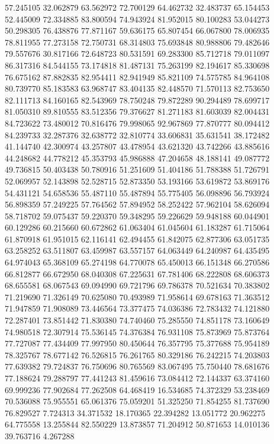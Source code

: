 57.245105
32.062879
63.562972
72.700129
64.462732
32.483737
65.154453
52.445009
72.334885
83.800594
74.943924
81.952015
80.100283
53.044273
50.298305
76.438876
77.871167
59.636175
65.807454
66.067800
78.006935
78.811955
77.273158
72.750731
68.314803
75.693848
80.988806
79.482646
79.557676
30.817166
72.648723
80.531591
69.283300
85.712718
79.011097
86.317316
84.544155
73.174818
81.487131
75.263199
82.194617
85.330698
76.675162
87.882835
82.954411
82.941949
85.821109
74.575785
84.964108
80.739770
85.183583
63.968747
83.404135
82.448570
71.570113
82.753650
82.111713
84.160165
82.543969
78.750248
79.872289
90.294489
78.699717
81.050310
89.810555
83.512356
79.376627
81.271183
81.603039
82.004431
84.723622
73.480012
70.816476
79.998065
92.967869
77.870777
80.094412
84.239733
32.287376
32.638772
32.810774
33.606831
35.631541
38.172482
41.144740
42.300974
43.257807
43.478954
43.621320
43.742266
43.885616
44.248682
44.778212
45.353793
45.986888
47.204658
48.188141
49.087772
49.736815
50.403438
50.780916
51.251609
51.404186
51.788388
51.726791
52.069957
52.143898
52.528715
52.873350
53.193166
53.619872
53.869176
54.431121
54.658536
55.487110
55.487894
55.775405
56.098896
56.793924
56.898359
57.249225
57.764562
57.894952
58.252422
57.962104
58.626094
58.718702
59.075437
59.220370
59.348295
59.226629
59.948188
60.044901
60.129286
60.215660
60.672862
61.063404
61.045604
61.183287
61.715064
61.870918
61.951015
62.116141
62.494455
61.842075
62.877306
63.051735
63.258252
63.511807
63.459987
63.557157
64.063449
64.240987
64.435495
64.974043
65.368109
65.274198
64.770078
65.450013
66.151348
66.270586
66.812877
66.672950
68.040308
67.225631
67.781406
68.222808
68.606373
68.655581
68.067543
69.094990
69.721796
69.786378
70.521634
70.383802
71.219690
71.326149
70.625080
70.493989
71.958614
69.678163
71.363512
71.947859
71.908089
73.446564
73.377475
74.036386
72.783432
74.121880
72.287401
73.851442
71.830380
74.740460
75.285550
74.851178
73.160649
74.980518
72.307914
75.536145
74.376384
76.931108
75.873969
75.873764
77.727087
77.434409
77.997950
80.450644
76.357795
75.377688
75.954189
78.325767
78.677142
76.526815
76.261765
80.329186
76.242215
74.203803
77.639382
79.724837
76.750696
80.765569
83.067495
75.750440
78.681676
77.188624
79.288797
77.441243
81.459616
73.084412
72.144337
63.374160
69.999236
77.902684
77.262508
64.468419
16.534685
74.372329
53.238469
70.536088
75.955551
65.061376
75.059201
51.325250
71.854255
81.737690
76.829527
7.724313
34.371532
18.170365
22.394282
13.051772
20.962275
64.775558
13.255844
82.550229
13.873857
71.204912
50.871653
14.010136
39.763716
4.267288
